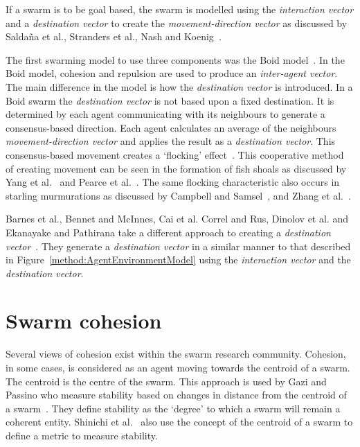 If a swarm is to be goal based, the swarm is modelled using the \textit{interaction vector} and a \textit{destination vector} to create the \textit{movement-direction vector} as discussed by Salda\~na et al., Stranders et al., Nash and Koenig~\cite{SOM:12, SRDF:10, NK:10}. 

The first swarming model to use three components was the Boid model~\cite{REY:87}. In the Boid model, cohesion and repulsion are used to produce an \textit{inter-agent vector}. The main difference in the model is how the \textit{destination vector} is introduced. In a Boid swarm the \textit{destination vector} is not based upon a fixed destination. It is determined by each agent communicating with its neighbours to generate a consensus-based direction. Each agent calculates an average of the neighbours \textit{movement-direction vector} and applies the result as a \textit{destination vector}. This consensus-based movement creates a `flocking' effect~\cite{KC:08, REY:87}. This cooperative method of creating movement can be seen in the formation of fish shoals as discussed by Yang et al.~\cite{YGT:10} and Pearce et al.~\cite{PMRT:14}. The same flocking characteristic also occurs in starling murmurations as discussed by Campbell and Samsel~\cite{CS:15}, and Zhang et al.~\cite{ZZLW:14}. 

Barnes et al., Bennet and McInnes, Cai et al. Correl and Rus, Dinolov et al. and Ekanayake and Pathirana take a different approach to creating a \textit{destination vector}~\cite{BAF:06, BAFVM:06, BM:09, CML:ND, CR:13, DLK:11, EP:10}. They generate a \textit{destination vector} in a similar manner to that described in Figure~\ref{method:AgentEnvironmentModel} using the \textit{interaction vector} and the \textit{destination vector}.

\section{Swarm cohesion}\label{sec:Cohesion1}
Several views of cohesion exist within the swarm research community. Cohesion, in some cases, is considered as an agent moving towards the centroid of a swarm. The centroid is the centre of the swarm. This approach is used by Gazi and Passino who measure stability based on changes in distance from the centroid of a swarm~\cite{GP:11, GP:04}. They define stability as the `degree' to which a swarm will remain a coherent entity. Shinichi et al.~\cite{AYSH:08} also use the concept of the centroid of a swarm to define a metric to measure stability.

